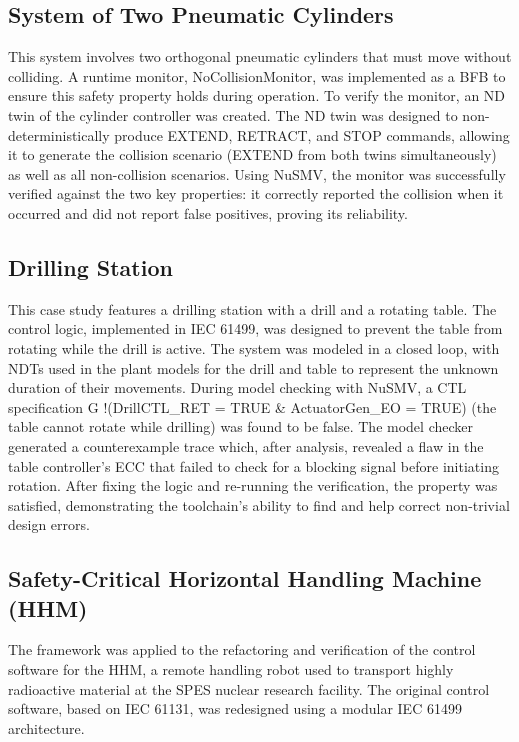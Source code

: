 \subsection{System of Two Pneumatic Cylinders}

This system involves two orthogonal pneumatic cylinders that must move without colliding. A runtime monitor, NoCollisionMonitor, was implemented as a BFB to ensure this safety property holds during operation. To verify the monitor, an ND twin of the cylinder controller was created. The ND twin was designed to non-deterministically produce EXTEND, RETRACT, and STOP commands, allowing it to generate the collision scenario (EXTEND from both twins simultaneously) as well as all non-collision scenarios. Using NuSMV, the monitor was successfully verified against the two key properties: it correctly reported the collision when it occurred and did not report false positives, proving its reliability.

\subsection{Drilling Station}

This case study features a drilling station with a drill and a rotating table. The control logic, implemented in IEC 61499, was designed to prevent the table from rotating while the drill is active. The system was modeled in a closed loop, with NDTs used in the plant models for the drill and table to represent the unknown duration of their movements. During model checking with NuSMV, a CTL specification G !(DrillCTL\_RET = TRUE \& ActuatorGen\_EO = TRUE) (the table cannot rotate while drilling) was found to be false. The model checker generated a counterexample trace which, after analysis, revealed a flaw in the table controller's ECC that failed to check for a blocking signal before initiating rotation. After fixing the logic and re-running the verification, the property was satisfied, demonstrating the toolchain's ability to find and help correct non-trivial design errors.

\subsection{Safety-Critical Horizontal Handling Machine (HHM)}

The framework was applied to the refactoring and verification of the control software for the HHM, a remote handling robot used to transport highly radioactive material at the SPES nuclear research facility. The original control software, based on IEC 61131, was redesigned using a modular IEC 61499 architecture.

